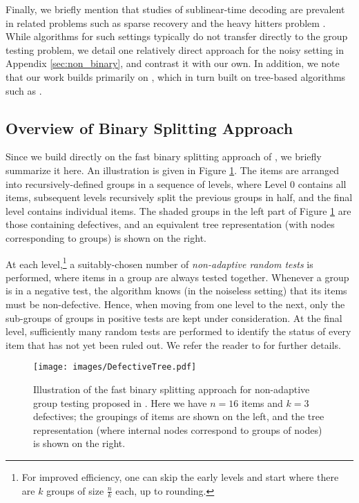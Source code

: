 Finally, we briefly mention that studies of sublinear-time decoding are prevalent in related problems such as sparse recovery \cite{Cor06,Gil07,Ber08a,Ind11} and the heavy hitters problem \cite{Cor05a,Cor08,Lar19}.  While algorithms for such settings typically do not transfer directly to the group testing problem, we detail one relatively direct approach for the noisy setting in Appendix \ref{sec:non_binary}, and contrast it with our own.  In addition, we note that our work builds primarily on \cite{cher20,Eri20}, which in turn built on tree-based algorithms such as \cite{Cor05a,Ind11}.

\subsection{Overview of Binary Splitting Approach} \label{sec:binary_split}

Since we build directly on the fast binary splitting approach of \cite{cher20,Eri20}, we briefly summarize it here.  An illustration is given in Figure \ref{fig:binary_split}.  The items are arranged into recursively-defined groups in a sequence of levels, where Level 0 contains all items, subsequent levels recursively split the previous groups in half, and the final level contains individual items.  The shaded groups in the left part of Figure \ref{fig:binary_split} are those containing defectives, and an equivalent tree representation (with nodes corresponding to groups) is shown on the right.

At each level,\footnote{For improved efficiency, one can skip the early levels and start where there are $k$ groups of size $\frac{n}{k}$ each, up to rounding.} a suitably-chosen number of \emph{non-adaptive random tests} is performed, where items in a group are always tested together.  Whenever a group is in a negative test, the algorithm knows (in the noiseless setting) that its items must be non-defective.  Hence, when moving from one level to the next, only the sub-groups of groups in positive tests are kept under consideration.  At the final level, sufficiently many random tests are performed to identify the status of every item that has not yet been ruled out.  We refer the reader to \cite{cher20,Eri20} for further details.

\begin{figure}[!t]
    \centering
    \texttt{[image: images/DefectiveTree.pdf]}
    \caption{Illustration of the fast binary splitting approach for non-adaptive group testing proposed in \cite{cher20,Eri20}.  Here we have $n=16$ items and $k=3$ defectives; the groupings of items are shown on the left, and the tree representation (where internal nodes correspond to groups of nodes) is shown on the right.} \label{fig:binary_split}
\end{figure}

